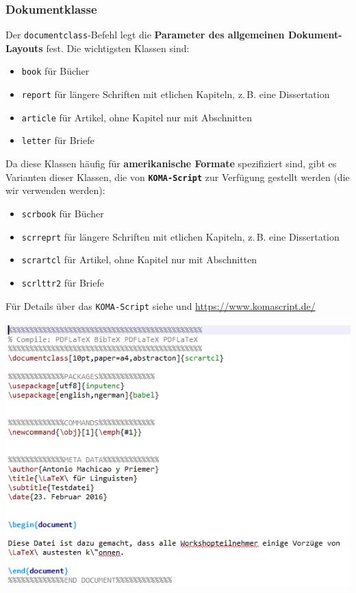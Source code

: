 \begin{frame}[fragile]
\frametitle{Dokumentklasse}

Der \lstinline|documentclass|-Befehl legt die \textbf{Parameter des allgemeinen Dokument-Layouts} fest. Die wichtigsten Klassen sind: 

\begin{itemize}
\item \texttt{book} für Bücher  
\item \texttt{report} für längere Schriften mit etlichen Kapiteln, z.\,B. eine Dissertation
\item \texttt{article} für Artikel, ohne Kapitel nur mit Abschnitten
\item \texttt{letter} für Briefe
\end{itemize}


\end{frame}


\begin{frame}[fragile]

Da diese Klassen häufig für \textbf{amerikanische Formate}
spezifiziert sind, gibt es Varianten dieser Klassen, die von
\textbf{\texttt{KOMA-Script}} zur Verfügung gestellt werden (die wir verwenden werden):

\begin{itemize}
\item \texttt{scrbook} für Bücher  
\item \texttt{scrreprt} für längere Schriften mit etlichen Kapiteln, z.\,B. eine Dissertation
\item \texttt{scrartcl} für Artikel, ohne Kapitel nur mit Abschnitten
\item \texttt{scrlttr2} für Briefe
\end{itemize}

Für Details über das \texttt{KOMA-Script} siehe \citet{Kohm&Co13a} und \url{https://www.komascript.de/}
\end{frame}


\begin{frame}[fragile]

\centering
\includegraphics[width=0.9\linewidth]{../../texfiles-beamer/tex-material/WissArb-latex/latexTest2tex}


\end{frame}

